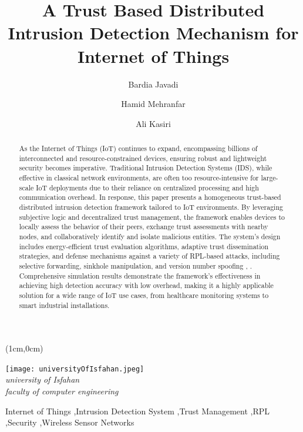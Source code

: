 \documentclass[final,5p,times,twocolumn]{elsarticle}
\begin{document}
\begin{frontmatter}
\begin{textblock*}{5cm}(1cm,0cm) 
\begin{center}
  \texttt{[image: universityOfIsfahan.jpeg]}
  \small\textit{\\university of Isfahan \\faculty of computer engineering}
\end{center}

\end{textblock*}

\title{A Trust Based Distributed Intrusion Detection
Mechanism for Internet of Things}

\author[]{Bardia Javadi}
\author[]{Hamid Mehranfar}
\author[]{Ali Kasiri}

\begin{abstract}
As the Internet of Things (IoT) continues to expand, encompassing billions of interconnected and resource-constrained devices, ensuring robust and lightweight security becomes imperative. Traditional Intrusion Detection Systems (IDS), while effective in classical network environments, are often too resource-intensive for large-scale IoT deployments due to their reliance on centralized processing and high communication overhead. In response, this paper presents
a homogeneous trust-based distributed intrusion detection framework tailored to IoT environments. By leveraging subjective logic and decentralized trust management, the framework enables devices to locally assess the behavior of their peers, exchange trust assessments with nearby nodes, and collaboratively identify and isolate malicious entities. The system’s design includes energy-efficient trust evaluation algorithms, adaptive trust dissemination strategies, and defense mechanisms against a variety of RPL-based attacks, including selective forwarding, sinkhole manipulation, 
and version number spoofing \cite{Khan2017}, \cite{Medjek2017}.
Comprehensive simulation results demonstrate the framework’s effectiveness in achieving high detection accuracy with low overhead, making it a highly applicable solution for a wide range of IoT use cases, from healthcare monitoring systems to smart industrial installations.
\end{abstract}

\begin{keyword}
Internet of Things \sep Intrusion Detection System \sep Trust Management \sep RPL \sep Security \sep Wireless Sensor Networks
\end{keyword}

\end{frontmatter}
\end{document}

